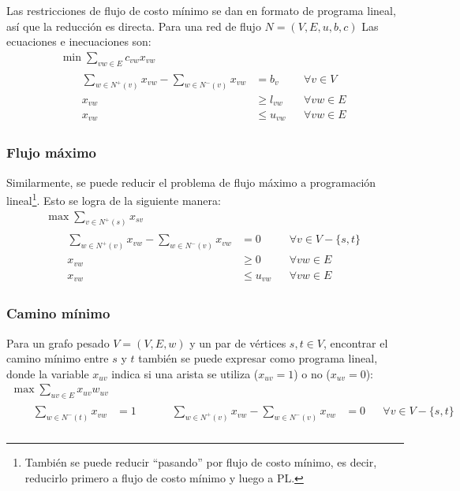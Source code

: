 Las restricciones de flujo de costo mínimo se dan en formato de programa lineal, así que la reducción es directa. Para una red de flujo $N = (V, E, u, b, c)$ Las ecuaciones e inecuaciones son:
\begin{gather*}
    \min{\sum_{vw \in E} c_{vw} x_{vw}} \\
    \begin{flalign*}
         &  & \sum_{w \in N^+(v)} x_{vw} - \sum_{w \in N^-(v)} x_{vw} & = b_v       &  & \forall v \in V  \\
         &  & x_{vw}                                                  & \geq l_{vw} &  & \forall vw \in E \\
         &  & x_{vw}                                                  & \leq u_{vw} &  & \forall vw \in E
    \end{flalign*}
\end{gather*}

\subsubsection{Flujo máximo}

Similarmente, se puede reducir el problema de flujo máximo a programación lineal\footnote{También se puede reducir ``pasando'' por flujo de costo mínimo, es decir, reducirlo primero a flujo de costo mínimo y luego a PL.}. Esto se logra de la siguiente manera:
\begin{gather*}
    \max{\sum_{v \in N^+(s)} x_{sv}} \\
    \begin{flalign*}
         &  & \sum_{w \in N^+(v)} x_{vw} - \sum_{w \in N^-(v)} x_{vw} & = 0         &  & \forall v \in V - \{s, t\} \\
         &  & x_{vw}                                                  & \geq 0      &  & \forall vw \in E           \\
         &  & x_{vw}                                                  & \leq u_{vw} &  & \forall vw \in E
    \end{flalign*}
\end{gather*}

\subsubsection{Camino mínimo}

Para un grafo pesado $V = (V, E, w)$ y un par de vértices $s, t \in V$, encontrar el camino mínimo entre $s$ y $t$ también se puede expresar como programa lineal, donde la variable $x_{uv}$ indica si una arista se utiliza ($x_{uv} = 1$) o no ($x_{uv} = 0$):
\begin{gather*}
    \max{\sum_{uv \in E} x_{uv} w_{uv}} \\
    \begin{flalign*}
         &  & \sum_{w \in N^-(t)} x_{vw}                              & = 1 &  &
         &  & \sum_{w \in N^+(v)} x_{vw} - \sum_{w \in N^-(v)} x_{vw} & = 0 &  & \forall v \in V - \{s, t\} \\
    \end{flalign*}
\end{gather*}

